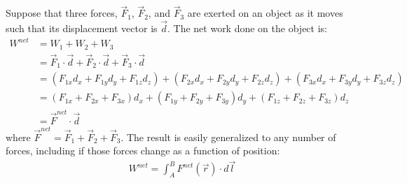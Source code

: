 Suppose that three forces, $\vec F_1$, $\vec F_2$, and $\vec F_3$ are exerted on an object as it moves such that its displacement vector is $\vec d$. The net work done on the object is:
\begin{align*}
W^{net} &= W_1 + W_2 + W_3 \\
&= \vec F_1 \cdot \vec d + \vec F_2 \cdot \vec d  + \vec F_3 \cdot \vec d \\
&=(F_{1x}d_x+F_{1y}d_y+F_{1z}d_z)+ (F_{2x}d_x+F_{2y}d_y+F_{2z}d_z) + (F_{3x}d_x+F_{3y}d_y+F_{3z}d_z)\\
&=(F_{1x} + F_{2x} + F_{3x})d_x+(F_{1y} + F_{2y} + F_{3y})d_y+(F_{1z} + F_{2z} + F_{3z})d_z\\
&=\vec F^{net} \cdot \vec d
\end{align*}
where $\vec F^{net} = \vec F_1 + \vec F_2 + \vec F_3$. The result is easily generalized to any number of forces, including if those forces change as a function of position:
\begin{align*}
W^{net} = \int_A^B F^{net}(\vec r) \cdot d\vec l
\end{align*} 

